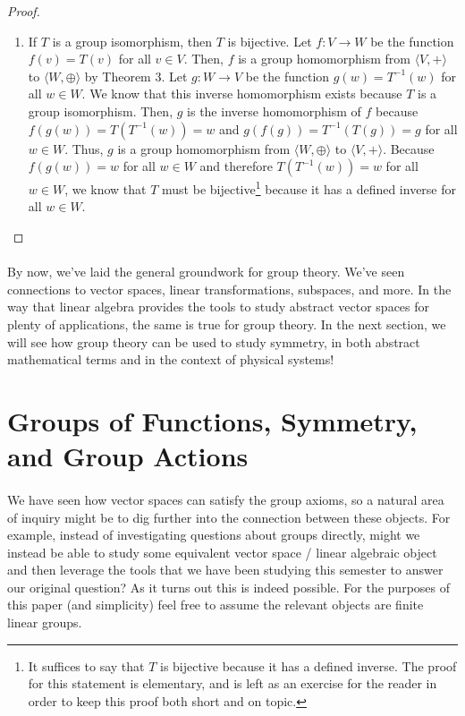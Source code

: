 \documentclass[twoside]{article}
\newcommand{\done}{\renewcommand\qedsymbol{$\blacksquare$}}
\begin{document}
\begin{spacing}{1.25}
\begin{proof}
\begin{enumerate}
    \item If $T$ is a group isomorphism, then $T$ is bijective. 
    Let $f:V\rightarrow W$ be the function $f(v) = T(v)$ for all $v\in V$. 
    Then, $f$ is a group homomorphism from $\langle V, + \rangle$ to 
    $\langle W, \oplus \rangle$ by Theorem 3. Let $g:W\rightarrow V$ be the 
    function $g(w) = T^{-1}(w)$ for all $w\in W$. We know 
    that this inverse homomorphism exists because $T$ is a group 
    isomorphism. Then, $g$ is the inverse 
    homomorphism of $f$ because $f(g(w)) = T(T^{-1}(w)) = w$ and 
    $g(f(g)) = T^{-1}(T(g)) = g$ for all $w\in W$. Thus, $g$ is a group 
    homomorphism from $\langle W, \oplus \rangle$ to $\langle V, + \rangle$. 
    Because $f(g(w)) = w$ for all $w\in W$ and therefore $T(T^{-1}(w)) = w$ for all $w\in W$,
    we know that $T$ must be bijective\footnote[4]{
      It suffices to say that $T$ is bijective because it has a defined inverse. The 
      proof for this statement is elementary, and is left as an exercise for the reader 
      in order to keep this proof both short and on topic.
    } because it has a defined inverse for all $w\in W$.
  \end{enumerate}   
\done
\end{proof}

\paragraph*{} By now, we've laid the general groundwork for group theory. We've seen
connections to vector spaces, linear transformations, subspaces, and more. In the way
that linear algebra provides the tools to study abstract vector spaces for plenty 
of applications, the same is true for group theory. In the next section, we will see
how group theory can be used to study symmetry, in both abstract mathematical terms 
and in the context of physical systems! 

\section{Groups of Functions, Symmetry, and Group Actions}
\paragraph*{} We have seen how vector spaces can satisfy the group axioms, so a natural 
area of inquiry might be to dig further into the connection between these objects. 
For example, instead of investigating questions about groups directly, might we instead 
be able to study some equivalent vector space / linear algebraic object and then leverage 
the tools that we have been studying this semester to answer our original question? As 
it turns out this is indeed possible. For the purposes of this paper (and simplicity) 
feel free to assume the relevant objects are finite linear groups. 


\end{spacing}
\end{document}
